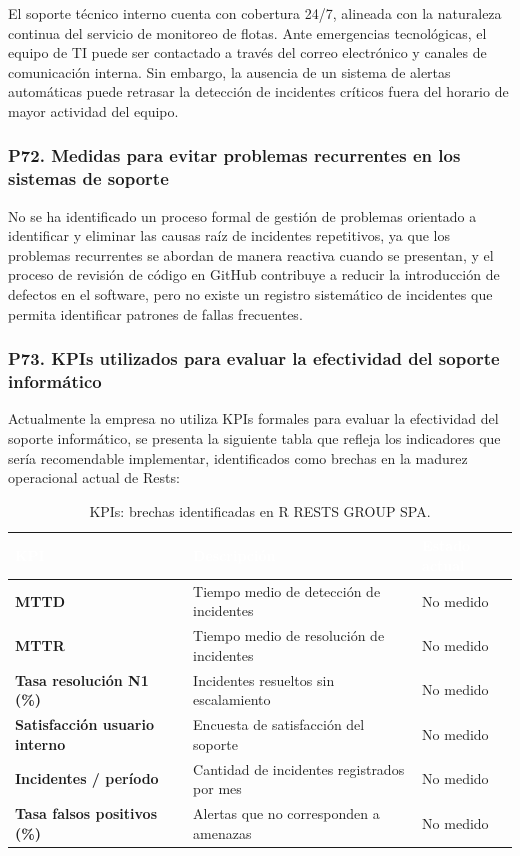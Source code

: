 \documentclass[12pt]{article}
\begin{document}
El soporte t\'ecnico interno cuenta con cobertura 24/7, alineada con la naturaleza
continua del servicio de monitoreo de flotas. Ante emergencias tecnol\'ogicas, el equipo de
TI puede ser contactado a trav\'es del correo electr\'onico y canales de comunicaci\'on
interna. Sin embargo, la ausencia de un sistema de alertas autom\'aticas puede retrasar la
detecci\'on de incidentes cr\'iticos fuera del horario de mayor actividad del equipo.

\subsubsection*{\textbf{P72. Medidas para evitar problemas recurrentes en los sistemas de soporte}}

No se ha identificado un proceso formal de gesti\'on de problemas orientado a identificar y eliminar las causas ra\'iz de incidentes repetitivos, ya que los problemas
recurrentes se abordan de manera reactiva cuando se presentan, y el proceso de revisi\'on de
c\'odigo en GitHub contribuye a reducir la introducci\'on de defectos en el software, pero
no existe un registro sistem\'atico de incidentes que permita identificar patrones de fallas
frecuentes.

\subsubsection*{\textbf{P73. KPIs utilizados para evaluar la efectividad del soporte inform\'atico}}

Actualmente la empresa no utiliza KPIs formales para evaluar la efectividad del
soporte inform\'atico, se presenta la siguiente tabla que refleja los indicadores que ser\'ia recomendable
implementar, identificados como brechas en la madurez operacional actual de Rests:

\begin{table}[H]
\centering
\renewcommand{\arraystretch}{1.4}
\begin{tabularx}{\textwidth}{>{\bfseries}l X >{\centering\arraybackslash}p{3.2cm}}
\toprule
\rowcolor{headerblue}
\textcolor{white}{\textbf{KPI}} &
\textcolor{white}{\textbf{Descripci\'on}} &
\textcolor{white}{\textbf{Estado actual}} \\
\midrule
MTTD & Tiempo medio de detecci\'on de incidentes & No medido \\
\rowcolor{rowgray}
MTTR & Tiempo medio de resoluci\'on de incidentes & No medido \\
Tasa resoluci\'on N1 (\%) & Incidentes resueltos sin escalamiento & No medido \\
\rowcolor{rowgray}
Satisfacci\'on usuario interno & Encuesta de satisfacci\'on del soporte & No medido \\
Incidentes / per\'iodo & Cantidad de incidentes registrados por mes & No medido \\
\rowcolor{rowgray}
Tasa falsos positivos (\%) & Alertas que no corresponden a amenazas & No medido \\
\bottomrule
\end{tabularx}
\caption{KPIs: brechas identificadas en R RESTS GROUP SPA.}
\end{table}
\end{document}
